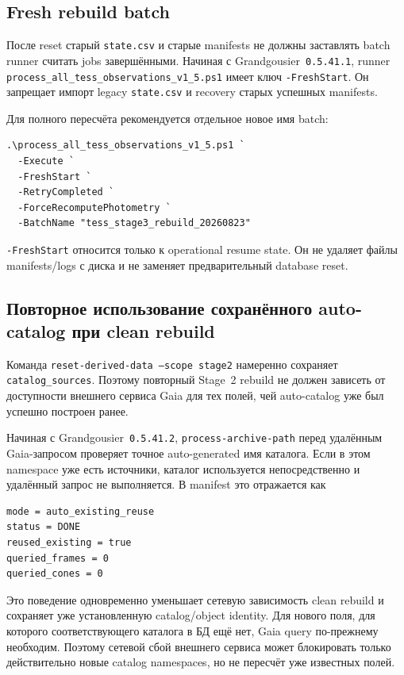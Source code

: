 \subsection{Fresh rebuild batch}

После reset старый \texttt{state.csv} и старые manifests не должны заставлять batch runner считать jobs завершёнными. Начиная с Grandgousier~\texttt{0.5.41.1}, runner \texttt{process\_all\_tess\_observations\_v1\_5.ps1} имеет ключ \texttt{-FreshStart}. Он запрещает импорт legacy \texttt{state.csv} и recovery старых успешных manifests.

Для полного пересчёта рекомендуется отдельное новое имя batch:

\begin{lstlisting}
.\process_all_tess_observations_v1_5.ps1 `
  -Execute `
  -FreshStart `
  -RetryCompleted `
  -ForceRecomputePhotometry `
  -BatchName "tess_stage3_rebuild_20260823"
\end{lstlisting}

\texttt{-FreshStart} относится только к operational resume state. Он не удаляет файлы manifests/logs с диска и не заменяет предварительный database reset.


\subsection{Повторное использование сохранённого auto-catalog при clean rebuild}

Команда \texttt{reset-derived-data --scope stage2} намеренно сохраняет \texttt{catalog\_sources}. Поэтому повторный Stage~2 rebuild не должен зависеть от доступности внешнего сервиса Gaia для тех полей, чей auto-catalog уже был успешно построен ранее.

Начиная с Grandgousier~\texttt{0.5.41.2}, \texttt{process-archive-path} перед удалённым Gaia-запросом проверяет точное auto-generated имя каталога. Если в этом namespace уже есть источники, каталог используется непосредственно и удалённый запрос не выполняется. В manifest это отражается как

\begin{lstlisting}
mode = auto_existing_reuse
status = DONE
reused_existing = true
queried_frames = 0
queried_cones = 0
\end{lstlisting}

Это поведение одновременно уменьшает сетевую зависимость clean rebuild и сохраняет уже установленную catalog/object identity. Для нового поля, для которого соответствующего каталога в БД ещё нет, Gaia query по-прежнему необходим. Поэтому сетевой сбой внешнего сервиса может блокировать только действительно новые catalog namespaces, но не пересчёт уже известных полей.



